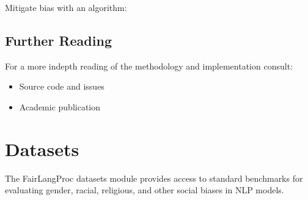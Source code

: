 \documentclass[letterpaper,10pt,english]{sphinxmanual}
\begin{document}
\sphinxAtStartPar
Mitigate bias with an algorithm:

\begin{sphinxVerbatim}[commandchars=\\\{\}]
 
 

   

  
     
     
\end{sphinxVerbatim}


\section{Further Reading}
\label{\detokenize{getting_started:further-reading}}
\sphinxAtStartPar
For a more in\sphinxhyphen{}depth reading of the methodology and implementation consult:
\begin{itemize}
\item {} 
\sphinxAtStartPar
{} \sphinxhyphen{} Source code and issues

\item {} 
\sphinxAtStartPar
{} \sphinxhyphen{} Academic publication

\end{itemize}

\sphinxstepscope


\chapter{Datasets}
\label{\detokenize{datasets:datasets}}\label{\detokenize{datasets::doc}}
\sphinxAtStartPar
The FairLangProc datasets module provides access to standard benchmarks for evaluating gender, racial, religious, and other social biases in NLP models.
\end{document}
